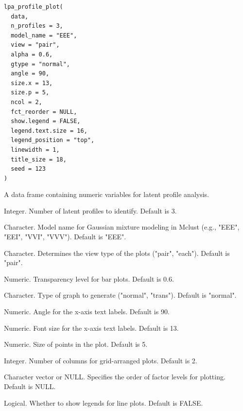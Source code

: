 \documentclass[a4paper]{book}
\begin{document}
%
\begin{Usage}
\begin{verbatim}
lpa_profile_plot(
  data,
  n_profiles = 3,
  model_name = "EEE",
  view = "pair",
  alpha = 0.6,
  gtype = "normal",
  angle = 90,
  size.x = 13,
  size.p = 5,
  ncol = 2,
  fct_reorder = NULL,
  show.legend = FALSE,
  legend.text.size = 16,
  legend_position = "top",
  linewidth = 1,
  title_size = 18,
  seed = 123
)
\end{verbatim}
\end{Usage}
%
\begin{Arguments}
\begin{ldescription}
\item[\code{data}] A data frame containing numeric variables for latent profile analysis.

\item[\code{n\_profiles}] Integer. Number of latent profiles to identify. Default is 3.

\item[\code{model\_name}] Character. Model name for Gaussian mixture modeling in Mclust (e.g., "EEE", "EEI", "VVI", "VVV"). Default is "EEE".

\item[\code{view}] Character. Determines the view type of the plots ("pair", "each"). Default is "pair".

\item[\code{alpha}] Numeric. Transparency level for bar plots. Default is 0.6.

\item[\code{gtype}] Character. Type of graph to generate ("normal", "trans"). Default is "normal".

\item[\code{angle}] Numeric. Angle for the x-axis text labels. Default is 90.

\item[\code{size.x}] Numeric. Font size for the x-axis text labels. Default is 13.

\item[\code{size.p}] Numeric. Size of points in the plot. Default is 5.

\item[\code{ncol}] Integer. Number of columns for grid-arranged plots. Default is 2.

\item[\code{fct\_reorder}] Character vector or NULL. Specifies the order of factor levels for plotting. Default is NULL.

\item[\code{show.legend}] Logical. Whether to show legends for line plots. Default is FALSE.


\end{ldescription}
\end{Arguments}
\end{document}
